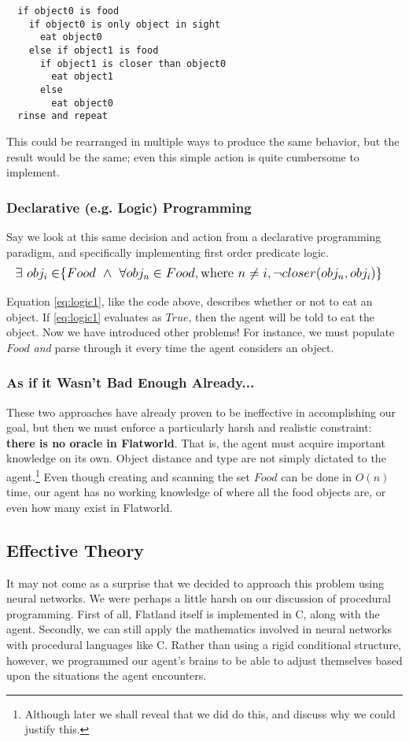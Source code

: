 \begin{verbatim}
  if object0 is food
    if object0 is only object in sight
      eat object0
    else if object1 is food
      if object1 is closer than object0
        eat object1 
      else
        eat object0
  rinse and repeat
\end{verbatim}

This could be rearranged in multiple ways to produce the same behavior,
but the result would be the same; even this simple action is quite cumbersome
to implement.

\subsubsection{Declarative (e.g. Logic) Programming}
Say we look at this same decision and action from a declarative programming
paradigm, and specifically implementing first order predicate logic.
\begin{equation} \label{eq:logic1}
  \large
  \begin{aligned}
    \exists\ obj_i \in &\{Food\ \wedge\ \forall obj_n \in Food, \text{where }
    n \neq i, \neg closer(obj_n,obj_i)\}
  \end{aligned}
\end{equation}

Equation \eqref{eq:logic1}, like the code above, describes whether or 
not to eat an object. If \eqref{eq:logic1} evaluates as $True$, then the agent 
will be told to eat the object. Now we have introduced other problems! For 
instance, we must populate $Food$ \emph{and} parse 
through it every time the agent considers an object. 

\subsubsection{As if it Wasn't Bad Enough Already...}
These two approaches have already proven to be ineffective in accomplishing
our goal, but then we must enforce a particularly harsh and realistic constraint: 
\textbf{there is no oracle in Flatworld}. That is, the agent must acquire
important knowledge on its own. Object distance and type are not simply
dictated to the agent.\footnote{Although later we shall reveal that we did
do this, and discuss why we could justify this.} Even though creating and
scanning the set $Food$ can be done in $O(n)$ time, our agent has no working
knowledge of where all the food objects are, or even how many exist
in Flatworld.


\subsection{Effective Theory}
It may not come as a surprise that we decided to approach this problem using
neural networks. We were perhaps a little harsh on our discussion of 
procedural programming. First of all, Flatland itself is implemented in C,
along with the agent. Secondly, we can still apply the mathematics involved
in neural networks with procedural languages like C. Rather than using a
rigid conditional structure, however, we programmed our agent's brains to
be able to adjust themselves based upon the situations the agent encounters.

